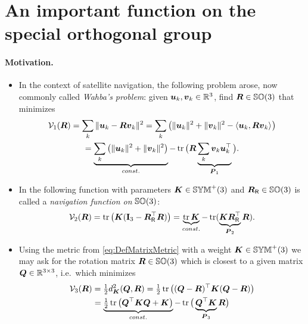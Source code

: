 \section{An important function on the special orthogonal group}\label{sec:AppendixAttitudePotential}
\paragraph{Motivation.}
\begin{itemize}
\item In the context of satellite navigation, the following problem \cite{Wahba:WahbaProblem} arose, now commonly called \textit{Wahba's problem}: given $\tuple{u}_k, \tuple{v}_k \in \RealNum^3$, find $\R \in \SpecialOrthogonalGroup(3)$ that minimizes
\begin{multline}
 \potentialEnergy_1(\R) = \sum_k \norm{\tuple{u}_k - \R \tuple{v}_k}^2
 = \sum_k \big( \norm{\tuple{u}_k}^2 + \norm{\tuple{v}_k}^2 - \sProd{\tuple{u}_k}{\R \tuple{v}_k} \big)
\\
 = \underbrace{\sum_k \big( \norm{\tuple{u}_k}^2 + \norm{\tuple{v}_k}^2 \big)}_{\const} - \tr\big( \R \underbrace{\sum_k \tuple{v}_k \tuple{u}_k^\top}_{\mat{P}_1} \big).
\end{multline}

\item In \cite{Koditschek:TotalEnergy} the following function with parameters $\mat{K}\in\SymMatP(3)$ and $\RR\in\SpecialOrthogonalGroup(3)$ is called a \textit{navigation function on} $\SpecialOrthogonalGroup(3)$:
\begin{align}
 \potentialEnergy_2(\R) = \tr\big(\mat{K}(\idMat[3] - \RR^\top\R)\big) = \underbrace{\tr\mat{K}}_{\const} - \tr(\underbrace{\mat{K}\RR^\top}_{\mat{P}_2}\R).
\end{align}

\item Using the metric from \eqref{eq:DefMatrixMetric} with a weight $\mat{K}\in\SymMatP(3)$ we may ask for the rotation matrix $\R \in \SpecialOrthogonalGroup(3)$ which is closest to a given matrix $\mat{Q}\in\RealNum^{3\times3}$, i.e.\ which minimizes
\begin{multline}
 \potentialEnergy_3(\R) = \tfrac{1}{2} \metricSq[\mat{K}]{\mat{Q}}{\R} 
 = \tfrac{1}{2} \tr\big( (\mat{Q}-\R)^\top \mat{K} (\mat{Q}-\R) \big)
\\
 = \underbrace{\tfrac{1}{2} \tr\big( \mat{Q}^\top \mat{K} \mat{Q} + \mat{K} \big)}_{\const} - \tr\big( \underbrace{\mat{Q}^\top \mat{K}}_{\mat{P}_3} \R \big)
\end{multline}
\end{itemize}

